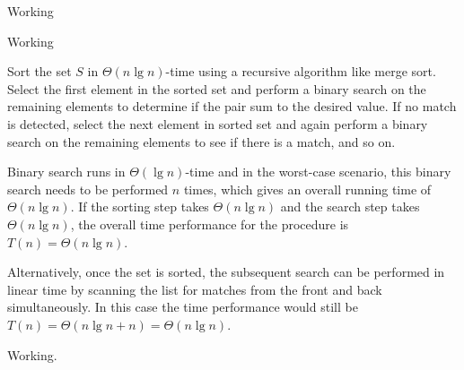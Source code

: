 \documentclass[a4paper,12pt]{article}
\begin{document}
Working

\vspace{5mm}


Working

\vspace{5mm}


Sort the set $S$ in $\Theta(n\lg n)$-time using a recursive algorithm like merge sort. Select the first element in the sorted 
set and perform a binary search on the remaining elements to determine if the pair sum to the desired value. If no match 
is detected, select the next element in sorted set and again perform a binary search on the remaining elements to see if there is a match, and so on.

Binary search runs in $\Theta(\lg n)$-time and in the worst-case scenario, this binary search needs to be performed $n$ times, which 
gives an overall running time of $\Theta(n \lg n)$. If the sorting step takes $\Theta(n \lg n)$ and the search step takes $\Theta (n \lg n)$, the overall time performance 
for the procedure is $T(n) = \Theta(n \lg n)$.

Alternatively, once the set is sorted, the subsequent search can be performed in linear time by scanning the list for matches from the front and back simultaneously. 
In this case the time performance would still be $T(n) = \Theta(n \lg n +n) = \Theta(n \lg n)$.

Working.
\end{document}
